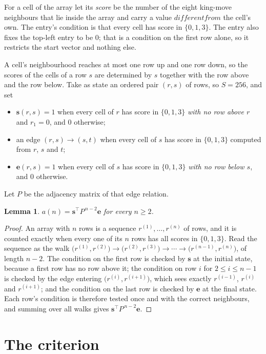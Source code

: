 \documentclass[11pt,a4paper]{article}
\theoremstyle{plain}
\newtheorem{lemma}[theorem]{Lemma}
\theoremstyle{definition}
\begin{document}
For a cell of the array let its \emph{score} be the number of the eight king-move neighbours that lie inside
the array and carry a value $different from$ the cell's own. The entry's condition is that every cell
has score in $\{0,1,3\}$. The entry also fixes the top-left entry to be $0$; that is a condition on the first row alone, so it restricts the start vector and nothing else.

A cell's neighbourhood reaches at most one row up and one row down, so the scores of the
cells of a row $s$ are determined by $s$ together with the row above and the row below.
Take as state an ordered pair $(r,s)$ of rows, so $S=256$, and set
\begin{itemize}
\item $\mathbf{s}(r,s)=1$ when every cell of $r$ has score in $\{0,1,3\}$ \emph{with no row
above $r$} and $r_1=0$, and $0$ otherwise;
\item an edge $(r,s)\to(s,t)$ when every cell of $s$ has score in $\{0,1,3\}$ computed from
$r$, $s$ and $t$;
\item $\mathbf{e}(r,s)=1$ when every cell of $s$ has score in $\{0,1,3\}$ \emph{with no row
below $s$}, and $0$ otherwise.
\end{itemize}
Let $P$ be the adjacency matrix of that edge relation.

\begin{lemma}\label{lem:walk}
$a(n)=\mathbf{s}^{\!\top}P^{\,n-2}\mathbf{e}$ for every $n\ge2$.
\end{lemma}

\begin{proof}
An array with $n$ rows is a sequence $r^{(1)},\dots,r^{(n)}$ of rows, and it is counted
exactly when every one of its $n$ rows has all scores in $\{0,1,3\}$. Read the sequence as the
walk $\bigl(r^{(1)},r^{(2)}\bigr)\to\bigl(r^{(2)},r^{(3)}\bigr)\to\cdots\to
\bigl(r^{(n-1)},r^{(n)}\bigr)$, of length $n-2$. The condition on the first row is
checked by $\mathbf{s}$ at the initial state, because a first row has no row above it; the
condition on row $i$ for $2\le i\le n-1$ is checked by the edge entering
$\bigl(r^{(i)},r^{(i+1)}\bigr)$, which sees exactly $r^{(i-1)}$, $r^{(i)}$ and
$r^{(i+1)}$; and the condition on the last row is checked by $\mathbf{e}$ at the final
state. Each row's condition is therefore tested once and with the correct neighbours, and
summing over all walks gives $\mathbf{s}^{\!\top}P^{\,n-2}\mathbf{e}$.
\end{proof}

\section{The criterion}
\end{document}
